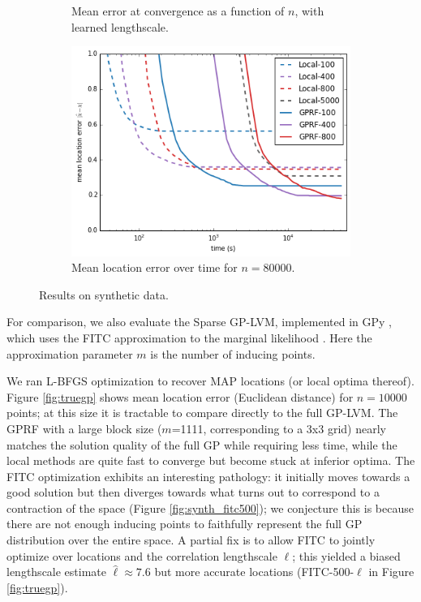 \documentclass{article}
\begin{document}
\begin{figure}
\begin{subfigure}[t]{.32\textwidth}
                 \caption{Mean error at convergence as a
                   function of $n$, with learned
                   lengthscale.}
                 \label{fig:fitc_lscale}
         \end{subfigure}\hspace{0.5em}
 \begin{subfigure}[t]{.32\textwidth}
                 \includegraphics[width=\textwidth]{eighty_bytime}
                 \caption{Mean location error over time for $n=80000$.}
                 \label{fig:eighty}
         \end{subfigure}
\caption{Results on synthetic data.}
\label{fig:synthresults}
\end{figure} 

For comparison, we also evaluate the Sparse GP-LVM, implemented in GPy
\cite{gpy2014}, which uses the FITC approximation to the
marginal likelihood \cite{lawrence2007learning}. Here the
approximation parameter $m$ is the number of inducing points. 

We ran L-BFGS optimization to recover MAP
locations (or local optima thereof). Figure \ref{fig:truegp} shows
mean location error (Euclidean distance) for $n=10000$ points; at this
size it is tractable to compare directly to the full GP-LVM. The GPRF
with a large block size ($m$=1111, corresponding to a 3x3 grid) nearly matches the solution
quality of the full GP while requiring less time, while the local
methods are quite fast to converge but become stuck at inferior
optima. The FITC optimization exhibits an interesting pathology: it
initially moves towards a good solution but then diverges towards what
turns out to correspond to
a contraction of the space (Figure \ref{fig:synth_fitc500}); we
conjecture this is because there are not enough inducing points to
faithfully represent the full GP distribution over the entire space. A
partial fix is to allow FITC to jointly optimize over locations and
the correlation lengthscale $\ell$; this yielded a biased lengthscale
estimate $\hat{\ell} \approx 7.6$ but more accurate
locations (FITC-500-$\ell$ in Figure \ref{fig:truegp}).
\end{document}
